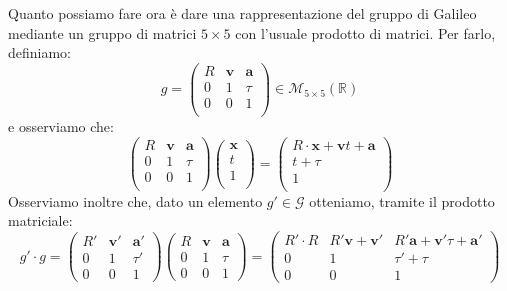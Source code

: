 \documentclass[a4paper,11pt]{book}
\theoremstyle{plain}
\theoremstyle{definition}
\begin{document}
Quanto possiamo fare ora è dare una rappresentazione del gruppo di Galileo mediante un gruppo di matrici $5\times 5$ con l'usuale prodotto di matrici. Per farlo, definiamo:
\[
g=
\left(
\begin{array}{ccc}
R & \textbf{v} & \textbf{a} \\
0 & 1 & \tau \\
0 & 0 & 1 \\
\end{array} \right) \in \mathcal{M}_{5\times 5}(\mathbb{R})
\]
e osserviamo che:
\[
\left(
\begin{array}{ccc}
R & \textbf{v} & \textbf{a} \\
0 & 1 & \tau \\
0 & 0 & 1 \\
\end{array} \right) 
\left( 
\begin{array}{c}
\textbf{x} \\
t \\
1 \\
\end{array} \right)= 
\left(
\begin{array}{c}
R\cdot \textbf{x} + \textbf{v}t + \textbf{a} \\
t+ \tau \\
 1 \\
\end{array} \right) 
\]
Osserviamo inoltre che, dato un elemento $g'\in \mathcal{G}$ otteniamo, tramite il prodotto matriciale:
\[
g'\cdot g = \left( \begin{array}{ccc} 
R' & \textbf{v}' & \textbf{a}' \\
0 & 1 & \tau' \\
0 & 0 & 1
\end{array} \right)
\left( \begin{array}{ccc} 
R & \textbf{v} & \textbf{a} \\
0 & 1 & \tau \\
0 & 0 & 1
\end{array} \right)=
\left( \begin{array}{ccc} 
R'\cdot R & R'\textbf{v}+\textbf{v}' & R'\textbf{a}+\textbf{v}'\tau+\textbf{a}' \\
0 & 1 & \tau'+\tau \\
0 & 0 & 1
\end{array} \right)
\]
\end{document}
